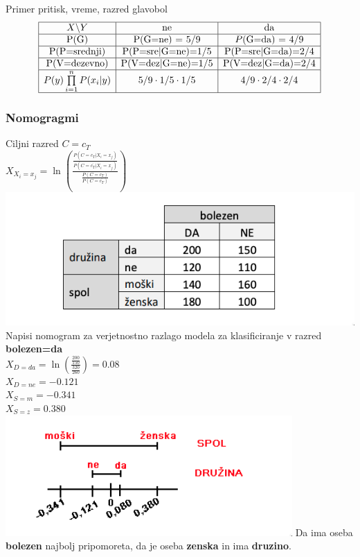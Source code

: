 Primer pritisk, vreme, razred glavobol
$$
\begin{array}{|c|c|c|}
    \hline
    X\backslash Y   & \text{ne}      & \text{da}\\
    \hline
    \text{P(G)}           & \text{P(G=ne) = 5/9}    & P\text{(G=da) = 4/9}\\
    \hline
    \text{P(P=srednji)}   & \text{P(P=sre|G=ne)=1/5} & \text{P(P=sre|G=da)=2/4}\\
    \hline
    \text{P(V=dezevno)} & \text{P(V=dez|G=ne)=1/5} & \text{P(V=dez|G=da)=2/4}\\
    \hline
    P(y)\prod\limits_{i=1}^n P(x_i|y) & \text{5/9}\cdot\text{1/5}\cdot\text{1/5} & \text{4/9}\cdot\text{2/4}\cdot\text{2/4}\\
    \hline
\end{array}
$$

\subsubsection{Nomogragmi}
Ciljni razred $C=c_T$\\
$X_{X_i=x_j}=\ln \left( \frac{\frac{P(C=c_T|X_i=x_j)}{P(C=\overline{c_T}|X_i=x_j)}}{\frac{P(C=c_T)}{P(C=\overline{c_T})}} \right) $\\
\includegraphics[width=\columnwidth]{images/nomogram.png}\\
Napisi nomogram za verjetnostno razlago modela za klasificiranje v razred \textbf{bolezen=da}\\
$X_{D=da}=\ln \left( \frac{\frac{200}{150}}{\frac{320}{260}}\right) = 0.08$\\
$X_{D=ne}=-0.121$\\
$X_{S=m}=-0.341$\\
$X_{S=z}=0.380$\\
\includegraphics[width=\columnwidth]{images/nomogram2.png}
Da ima oseba \textbf{bolezen} najbolj pripomoreta, da je 
oseba \textbf{zenska} in ima \textbf{druzino}.

